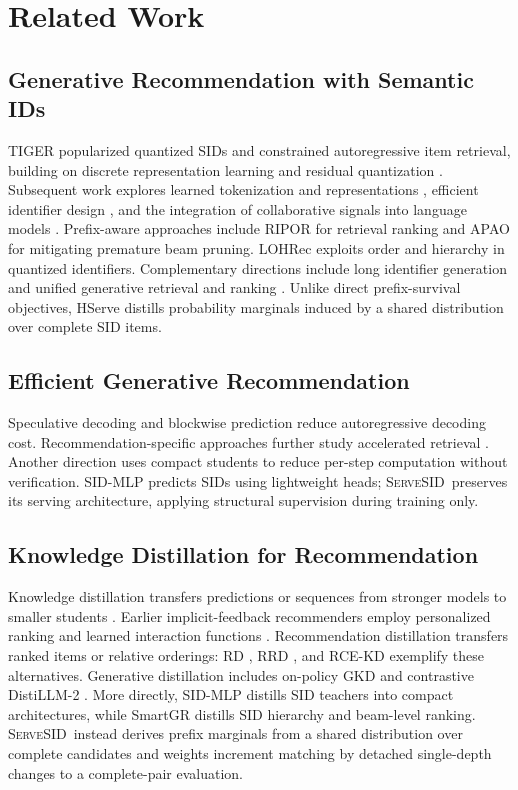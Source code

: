 \documentclass[sigconf, anonymous, review]{acmart}
\newcommand{\method}{\textsc{ServeSID}}
\begin{document}
\section{Related Work}
\label{sec:related}

\subsection{Generative Recommendation with Semantic IDs}
TIGER \citep{tiger} popularized quantized SIDs and constrained
autoregressive item retrieval, building on discrete representation
learning and residual quantization \citep{vqvae,rqvae}.
Subsequent work explores learned tokenization and representations
\citep{actionpiece,letter,etegrec,idgenrec}, efficient identifier
design \citep{effitemid,practsid}, and the integration of
collaborative signals into language models \citep{lcrec,llmrecsurvey}.
Prefix-aware approaches
include RIPOR \citep{ripor} for retrieval ranking and APAO
\citep{apao} for mitigating premature beam pruning. LOHRec
\citep{lohrec} exploits order and hierarchy in quantized identifiers.
Complementary directions include long identifier generation and
unified generative retrieval and ranking \citep{rpg,liger,onerec}.
Unlike direct prefix-survival objectives, HServe distills probability
marginals induced by a shared distribution over complete SID items.

\subsection{Efficient Generative Recommendation}
Speculative decoding \citep{specdec,specsample} and blockwise
prediction \citep{blockwise} reduce autoregressive decoding cost.
Recommendation-specific approaches further study accelerated
retrieval \citep{specgr,atspeed}. Another direction uses compact
students to reduce per-step computation without verification.
SID-MLP \citep{sidmlp} predicts SIDs using lightweight heads;
\method\ preserves its serving architecture, applying structural
supervision during training only.

\subsection{Knowledge Distillation for Recommendation}
Knowledge distillation transfers predictions or sequences from
stronger models to smaller students \citep{hintonkd,seqkd,distilbert}.
Earlier implicit-feedback recommenders employ personalized ranking
and learned interaction functions \citep{bpr,ncf}.
Recommendation distillation transfers ranked items or relative
orderings: RD \citep{rankdistill}, RRD \citep{rrd}, and
RCE-KD \citep{rcekd} exemplify these alternatives. Generative
distillation includes on-policy GKD \citep{gkd} and contrastive
DistiLLM-2 \citep{distillm}. More directly, SID-MLP \citep{sidmlp}
distills SID teachers into compact architectures, while SmartGR
\citep{smartgr} distills SID hierarchy and beam-level ranking.
\method\ instead derives prefix marginals from a shared distribution
over complete candidates and weights increment matching by detached
single-depth changes to a complete-pair evaluation.
\end{document}
